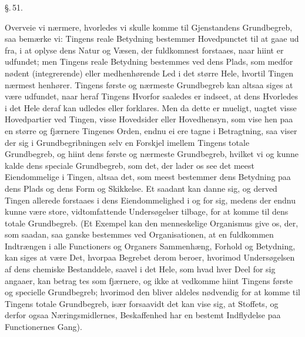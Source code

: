\documentclass[12pt]{book}
\def\textit#1{#1}%
\def\emph#1{#1}%
\newcommand{\parag}[1]{%
  \par\vspace{0.9\baselineskip}%
  {\centering\textit{\S.\,#1.}\par}%
  \vspace{0.35\baselineskip}%
  \noindent\hspace{\parindent}\ignorespaces
}
\newcommand{\opage}[1]{\marginnote{\footnotesize\textit{[#1]}}}
\begin{document}
\parag{51}

Overveie vi nærmere, hvorledes vi skulle komme til Gjenstandens Grundbegreb, saa
bemærke vi: Tingens reale Betydning bestemmer Hovedpunctet til at gaae ud fra, i
at oplyse dens Natur og Væsen, der fuldkomnest forstaaes, naar hiint er
udfundet; men Tingens reale Betydning bestemmes ved dens Plads, som medfor%
\opage{117}nødent (integrerende) eller medhenhørende Led i det større Hele, hvortil Tingen
nærmest henhører. Tingens første og nærmeste Grundbegreb kan altsaa siges at
være udfundet, naar heraf Tingens Hvorfor saaledes er indseet, at dens Hvorledes
i det Hele deraf kan udledes eller forklares. Men da dette er mueligt, uagtet
visse Hovedpartier ved Tingen, visse Hovedsider eller Hovedhensyn, som vise hen
paa en større og fjærnere Tingenes Orden, endnu ei ere tagne i Betragtning, saa
viser der sig i Grundbegribningen selv en Forskjel imellem Tingens totale
Grundbegreb, og hiint dens første og nærmeste Grundbegreb, hvilket vi og kunne
kalde dens speciale Grundbegreb, som det, der lader os see det meest
\emph{Eiendommelige} i Tingen, altsaa det, som meest bestemmer dens Betydning
paa dens Plads og dens Form og Skikkelse. Et saadant kan danne sig, og derved
Tingen allerede forstaaes i dens Eiendommelighed i og for sig, medens der endnu
kunne være store, vidtomfattende Undersøgelser tilbage, for at komme til dens
totale Grundbegreb. (Et Exempel kan den menneskelige Organismus give os, der,
som saadan, saa ganske bestemmes ved Organisationen, at en fuldkommen
Indtrængen i alle Functioners og Organers Sammenhæng, Forhold og Betydning, kan
siges at være Det, hvorpaa Begrebet derom beroer, hvorimod Undersøgelsen af dens
chemiske Bestanddele, saavel i det Hele, som hvad hver Deel for sig angaaer, kan
betrag%
\opage{118}tes som fjærnere, og ikke at vedkomme hiint Tingens første og specielle
Grundbegreb; hvorimod den bliver aldeles nødvendig for at komme til Tingens
totale Grundbegreb, især forsaavidt det kan vise sig, at Stoffets, og derfor
ogsaa Næringsmidlernes, Beskaffenhed har en bestemt Indflydelse paa
Functionernes Gang).
\end{document}
